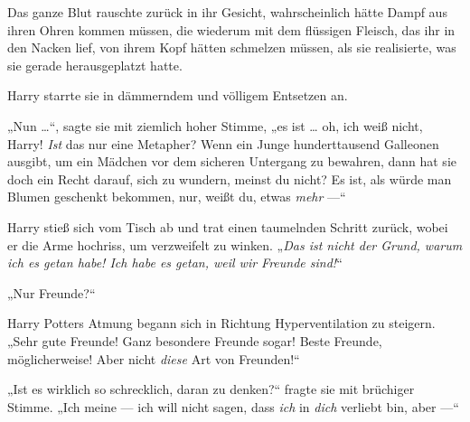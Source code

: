 Das ganze Blut rauschte zurück in ihr Gesicht, wahrscheinlich hätte Dampf aus ihren Ohren kommen müssen, die wiederum mit dem flüssigen Fleisch, das ihr in den Nacken lief, von ihrem Kopf hätten schmelzen müssen, als sie realisierte, was sie gerade herausgeplatzt hatte.

Harry starrte sie in dämmerndem und völligem Entsetzen an.

„Nun …“, sagte sie mit ziemlich hoher Stimme, „es ist … oh, ich weiß nicht, Harry! \emph{Ist} das nur eine Metapher? Wenn ein Junge hunderttausend Galleonen ausgibt, um ein Mädchen vor dem sicheren Untergang zu bewahren, dann hat sie doch ein Recht darauf, sich zu wundern, meinst du nicht? Es ist, als würde man Blumen geschenkt bekommen, nur, weißt du, etwas \emph{mehr} —“

Harry stieß sich vom Tisch ab und trat einen taumelnden Schritt zurück, wobei er die Arme hochriss, um verzweifelt zu winken.
„\emph{Das ist nicht der Grund, warum ich es getan habe! Ich habe es getan, weil wir Freunde sind!}“

„Nur Freunde?“

Harry Potters Atmung begann sich in Richtung Hyperventilation zu steigern.
„Sehr gute Freunde! Ganz besondere Freunde sogar! Beste Freunde, möglicherweise! Aber nicht \emph{diese} Art von Freunden!“

„Ist es wirklich so schrecklich, daran zu denken?“ fragte sie mit brüchiger Stimme.
„Ich meine — ich will nicht sagen, dass \emph{ich} in \emph{dich} verliebt bin, aber —“

